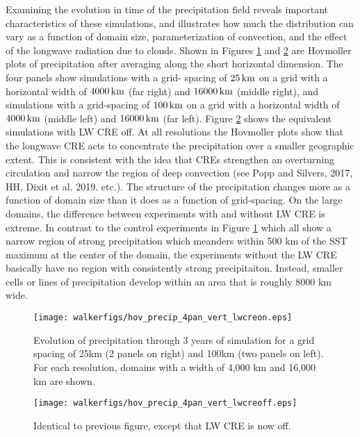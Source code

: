 \documentclass[11pt]{article}   	%
\begin{document}
Examining the evolution in time of the precipitation field reveals important characteristics of these simulations, and 
illustrates how much the distribution can vary as a function of domain size, parameterization of convection, and the effect of the 
longwave radiation due to clouds. 
Shown in Figures {\ref{fig:domdep}} and {\ref{fig:domdep_lwoff}} are Hovmoller plots of precipitation after 
averaging along the short horizontal dimension.  The four panels show simulations with a grid-
spacing of $25\, \rm{km}$ on a grid with a horizontal width of $4000\, \rm{km}$ (far right) and $16000\, \rm{km}$ (middle right), and 
simulations with a grid-spacing of $100\, \rm{km}$ on a grid with a horizontal width of $4000\, \rm{km}$ (middle left) and 
$16000\, \rm{km}$ (far left).  Figure  {\ref{fig:domdep_lwoff}} shows the equivalent simulations with LW CRE off.    
 At all resolutions the Hovmoller plots show that the longwave CRE acts to concentrate the 
precipitation over a smaller geographic extent.   This is consistent with the idea that CREs strengthen an overturning circulation and
narrow the region of deep convection (see Popp and Silvers, 2017, HH, Dixit et al. 2019.  etc.).
The structure of the precipitation changes more as a function of domain size than it does as a function of grid-spacing. 
On the large domains, the difference between experiments with and without LW CRE is extreme.  In contrast to the control 
experiments in Figure {\ref{fig:domdep}} which all show a narrow region of strong precipitation which meanders within 
500 km of the SST maximum at the center of the domain,  
the experiments without the LW CRE basically have no region with consistently strong precipitaiton.  Instead, 
smaller cells or lines of precipitation develop within an area that is roughly 8000 km wide.        

\begin{figure}
  \texttt{[image: walkerfigs/hov\_precip\_4pan\_vert\_lwcreon.eps]}
  \caption{Evolution of precipitation through 3 years of simulation for a grid spacing of 25km (2 panels on right) and
  100km (two panels on left).  For each resolution, domains with a width of 4,000 km and 16,000 km are shown.}
  \label{fig:domdep}
\end{figure}

\begin{figure}
  \texttt{[image: walkerfigs/hov\_precip\_4pan\_vert\_lwcreoff.eps]}
  \caption{Identical to previous figure, except that LW CRE is now off.}
  \label{fig:domdep_lwoff}
\end{figure}
\end{document}
